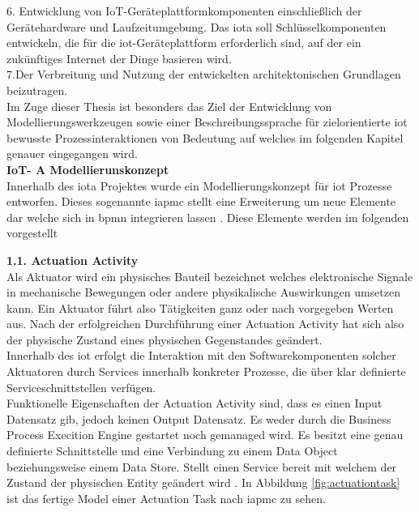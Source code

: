 \documentclass[a4paper, 12pt, twoside, headsepline=true]{scrartcl} %
\begin{document}
6. Entwicklung von IoT-Geräteplattformkomponenten einschließlich der Gerätehardware und Laufzeitumgebung. Das \ac{iota} soll Schlüsselkomponenten entwickeln, die für die \ac{iot}-Geräteplattform erforderlich sind, auf der ein zukünftiges Internet der Dinge basieren wird. \\

7.Der Verbreitung und Nutzung der entwickelten architektonischen Grundlagen beizutragen.\\

Im Zuge dieser Thesis ist besonders das Ziel der Entwicklung von Modellierungswerkzeugen sowie einer Beschreibungssprache für zielorientierte \ac{iot} bewusste Prozessinteraktionen von Bedeutung auf welches im folgenden Kapitel genauer eingegangen wird. \\

\textbf{IoT- A Modellierunskonzept}\\

Innerhalb des \ac{iota} Projektes wurde ein Modellierungskonzept für \ac{iot} Prozesse entworfen. Dieses sogenannte \ac{iapmc} stellt eine Erweiterung um neue Elemente dar welche sich in \ac{bpmn} integrieren lassen  \cite{conceptsiotawarepm}. Diese Elemente werden im folgenden vorgestellt
\newline

\textbf{1.1. Actuation Activity}\\

Als Aktuator wird ein physisches Bauteil bezeichnet welches elektronische Signale in mechanische Bewegungen oder andere physikalische Auswirkungen umsetzen kann. Ein Aktuator führt also Tätigkeiten ganz oder nach vorgegeben Werten aus. Nach der erfolgreichen Durchführung einer Actuation Activity hat sich also der physische Zustand eines physischen Gegenstandes geändert.\\
Innerhalb des \ac{iot} erfolgt die Interaktion mit den Softwarekomponenten solcher Aktuatoren durch Services innerhalb konkreter Prozesse, die über klar definierte Serviceschnittstellen verfügen.\\
Funktionelle Eigenschaften der Actuation Activity sind, dass es einen Input Datensatz gib, jedoch keinen Output Datensatz. Es weder durch die Business Process Execition Engine gestartet noch gemanaged wird. Es besitzt eine genau definierte Schnittstelle und eine Verbindung zu einem Data Object beziehungsweise einem Data Store. Stellt einen Service bereit mit welchem der Zustand der physischen Entity geändert wird \cite[S.41]{conceptsiotawarepm}. In Abbildung \ref{fig:actuationtask} ist das fertige Model einer Actuation Task nach \ac{iapmc} zu sehen.
\end{document}
